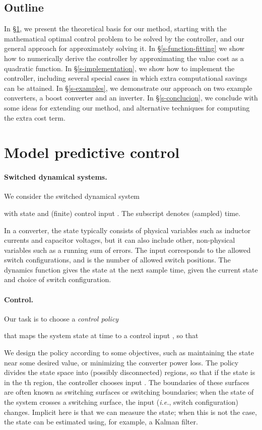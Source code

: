 \documentclass[12pt]{article}
\newcommand{\ie}{{\it i.e.}}
\begin{document}
\subsection{Outline}
In \S\ref{s-mpc}, we present the theoretical basis for our method,
starting with the mathematical optimal control problem
to be solved by the controller,
and our general approach for approximately solving it.
In \S\ref{s-function-fitting}
we show how to numerically derive the controller
by approximating the value cost as a quadratic function.
In \S\ref{s-implementation}, we show how to implement the controller,
including several special cases in which extra computational savings can be attained.
In \S\ref{s-examples}, we demonstrate our approach on 
two example converters, a boost converter and an inverter.
In \S\ref{s-conclucion}, we conclude with some ideas for extending our method,
and alternative techniques for computing the extra cost term.


\section{Model predictive control}
\label{s-mpc}

\paragraph{Switched dynamical systems.}
We consider the switched dynamical system

with state  and 
(finite) control input .
The subscript  denotes (sampled) time.

In a converter, the state typically consists of physical variables 
such as inductor currents and capacitor voltages, 
but it can also include other, non-physical variables such as
a running sum of errors.
The input corresponds to the allowed switch configurations, and  is
the number of allowed switch positions.
The dynamics function  gives the state at the next sample time,
given the current state and choice of switch configuration.

\paragraph{Control.}
Our task is to choose a \emph{control policy} 

that maps the system state  at time  to a control input , so that

We design the policy according to some objectives, 
such as maintaining the state near some desired value,
or minimizing the converter power loss.
The policy divides the state space into  
(possibly disconnected) regions,
so that if the state is in the th region,
the controller chooses input .
The boundaries of these surfaces are often known as switching surfaces
or switching boundaries;
when the state of the system crosses a switching surface, the 
input (\ie, switch configuration) changes.
Implicit here is that we can measure the state; when this is not the case,
the state can be estimated using, for example, a Kalman filter.
\end{document}
